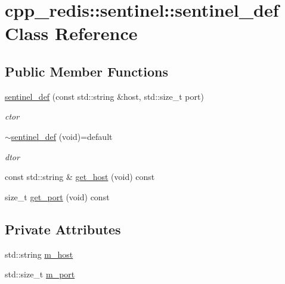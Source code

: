 \hypertarget{classcpp__redis_1_1sentinel_1_1sentinel__def}{}\section{cpp\+\_\+redis\+:\+:sentinel\+:\+:sentinel\+\_\+def Class Reference}
\label{classcpp__redis_1_1sentinel_1_1sentinel__def}
\subsection*{Public Member Functions}
\begin{DoxyCompactItemize}
\item 
\hyperlink{classcpp__redis_1_1sentinel_1_1sentinel__def_ab13345b9612cb7ea8e93594166a90f88}{sentinel\+\_\+def} (const std\+::string \&host, std\+::size\+\_\+t port)
\begin{DoxyCompactList}\small\item\em ctor \end{DoxyCompactList}\item 
\hyperlink{classcpp__redis_1_1sentinel_1_1sentinel__def_a5189d8016d9b385099e5ee0828ed7666}{$\sim$sentinel\+\_\+def} (void)=default
\begin{DoxyCompactList}\small\item\em dtor \end{DoxyCompactList}\item 
const std\+::string \& \hyperlink{classcpp__redis_1_1sentinel_1_1sentinel__def_af61b33ea2b5154735e4b804039771f19}{get\+\_\+host} (void) const
\item 
size\+\_\+t \hyperlink{classcpp__redis_1_1sentinel_1_1sentinel__def_a1994bec14cc8703d1198de96b66a0f30}{get\+\_\+port} (void) const
\end{DoxyCompactItemize}
\subsection*{Private Attributes}
\begin{DoxyCompactItemize}
\item 
std\+::string \hyperlink{classcpp__redis_1_1sentinel_1_1sentinel__def_a5f5efdba90e4fe48c645d91b8bd5630b}{m\+\_\+host}
\item 
std\+::size\+\_\+t \hyperlink{classcpp__redis_1_1sentinel_1_1sentinel__def_a24d75c0372a036370706db65f8c2268f}{m\+\_\+port}
\end{DoxyCompactItemize}


